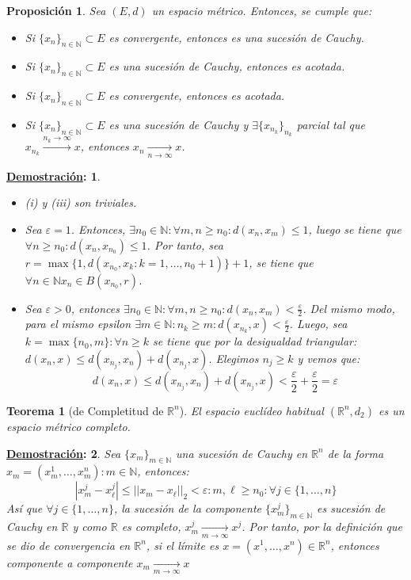 \documentclass[10pt,a4paper,openright]{book}
\theoremstyle{break}
\newtheorem*{theo}{Teorema}
\newtheorem*{prop}{Proposición}
\newtheorem*{demo}{\underline{Demostración}:}
\begin{document}
\begin{prop}
Sea $(E,d)$ un espacio métrico. Entonces, se cumple que:
\begin{itemize}
\item Si $\{x_n\}_{n\in \mathbb{N}} \subset E$ es convergente, entonces es una sucesión de Cauchy.
\item Si $\{x_n\}_{n\in \mathbb{N}} \subset E$ es una sucesión de Cauchy, entonces es acotada.
\item Si $\{x_n\}_{n\in \mathbb{N}} \subset E$ es convergente, entonces  es acotada.
\item Si $\{x_n\}_{n\in \mathbb{N}} \subset E$ es una sucesión de Cauchy y $\exists \{ x_{n_k}\}_{n_k} $ parcial tal que $x_{n_k} \xrightarrow{n_k\rightarrow\infty} x$, entonces $x_n \xrightarrow[n\rightarrow\infty]{} x$.
\end{itemize}
\end{prop}

\begin{demo}
\begin{itemize}
\item (i) y (iii) son triviales.
\item Sea $\varepsilon = 1$. Entonces, $\exists n_0\in \mathbb{N} : \forall m,n \geq n_0 : d(x_n, x_m) \leq 1$, luego se tiene que $\forall n \geq n_0: d(x_n, x_{n_0}) \leq 1$. Por tanto, sea $r = \max \{1, d(x_{n_0}, x_k : k=1, \ldots, n_0 + 1)\} + 1$, se tiene que $\forall n \in \mathbb{N}x_n \in B(x_{n_0}, r)$.

\item Sea $\varepsilon > 0$, entonces $\exists n_0 \in \mathbb{N} :\forall  m, n \geq n_0: d(x_n,x_m) < \frac{\varepsilon}{2}$. Del mismo modo, para el mismo \textit{epsilon} $\exists m \in \mathbb{N} : n_k \geq m: d(x_{n_k}, x) < \frac{\varepsilon}{2}$. Luego, sea $k = \max\{n_0, m\} : \forall n \geq k$ se tiene que por la desigualdad triangular:
$d(x_n, x) \leq d(x_{n_j}, x_n) + d(x_{n_j},x)$. Elegimos $n_j \geq k$ y vemos que:
$$d(x_n, x) \leq d(x_{n_j}, x_n) + d(x_{n_j},x) < \frac{\varepsilon}{2} + \frac{\varepsilon}{2} = \varepsilon$$
\end{itemize}
\end{demo}

\begin{theo}[de Completitud de $\mathbb{R}^n$]
El espacio euclídeo habitual $(\mathbb{R}^n, d_2)$ es un espacio métrico completo.
\end{theo}

\begin{demo}
Sea $\{x_m\}_{m\in \mathbb{N}}$ una sucesión de Cauchy en $\mathbb{R}^n$ de la forma $x_m = (x_m^1, \ldots , x_m^n) : m \in \mathbb{N}$, entonces:
$$|x_m^j - x_\ell^j| \leq ||x_m - x_\ell ||_2 < \varepsilon : m,\ell \geq n_0 : \forall j \in \{ 1, \ldots,n\}$$
Así que $\forall j \in \{ 1, \ldots,n\}$, la sucesión de la componente $\{x_m^j\}_{m \in \mathbb{N}}$ es sucesión de Cauchy en $\mathbb{R}$ y como $\mathbb{R}$ es completo, $x_m^j \xrightarrow[m\rightarrow\infty]{} x^j$. Por tanto, por la definición que se dio de convergencia en $\mathbb{R}^{n}$, si el límite es $x=(x^1, \ldots, x^n) \in \mathbb{R}^n$, entonces componente a componente $x_m \xrightarrow[m\rightarrow\infty]{} x$
\end{demo}
\end{document}

